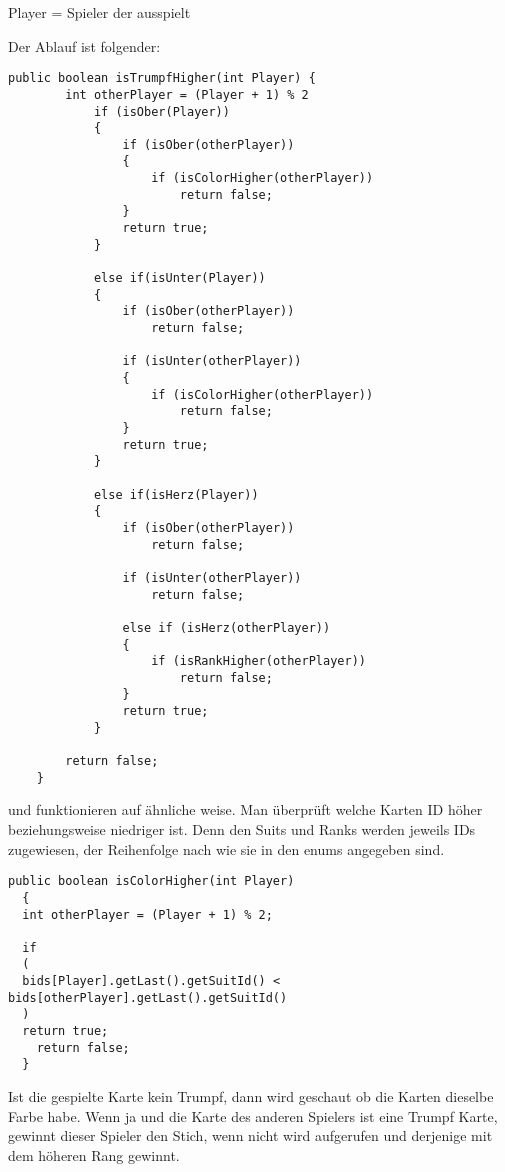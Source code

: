 Player = Spieler der ausspielt

Der Ablauf ist folgender:
\begin{lstlisting}[caption={isTrumpfHigher Methode},captionpos=b]
    public boolean isTrumpfHigher(int Player) {
        int otherPlayer = (Player + 1) % 2
            if (isOber(Player))
            {
                if (isOber(otherPlayer))
                {
                    if (isColorHigher(otherPlayer))
                        return false; 
                }
                return true;
            }

            else if(isUnter(Player))
            {
                if (isOber(otherPlayer))
                    return false;

                if (isUnter(otherPlayer))
                {
                    if (isColorHigher(otherPlayer))
                        return false;
                }
                return true;
            }

            else if(isHerz(Player))
            {
                if (isOber(otherPlayer))
                    return false;

                if (isUnter(otherPlayer))
                    return false;

                else if (isHerz(otherPlayer))
                {
                    if (isRankHigher(otherPlayer))
                        return false; 
                }
                return true;
            }

        return false;
    }
    \end{lstlisting}
 
 und  funktionieren auf ähnliche weise. Man überprüft welche Karten ID höher beziehungsweise niedriger ist.
Denn den Suits und Ranks werden jeweils IDs zugewiesen, der Reihenfolge nach wie sie in den enums angegeben sind.

\begin{lstlisting}[caption={IDs am Beispiel von isColorHigher},captionpos=b]
  public boolean isColorHigher(int Player)  
  {
  int otherPlayer = (Player + 1) % 2;
        
  if 
  (
  bids[Player].getLast().getSuitId() < bids[otherPlayer].getLast().getSuitId()
  )
  return true;
  	return false;
  }
\end{lstlisting}

Ist die gespielte Karte kein Trumpf, dann wird geschaut ob die Karten dieselbe Farbe habe. Wenn ja und die Karte des anderen Spielers ist eine Trumpf Karte, gewinnt dieser Spieler den Stich, wenn nicht wird  aufgerufen und derjenige mit dem höheren Rang gewinnt.

